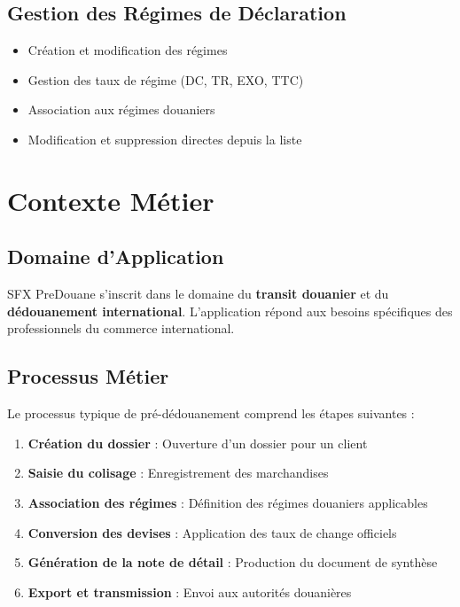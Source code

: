\documentclass[12pt,a4paper]{report}
\begin{document}
\subsection{Gestion des Régimes de Déclaration}
\begin{itemize}[leftmargin=*]
    \item Création et modification des régimes
    \item Gestion des taux de régime (DC, TR, EXO, TTC)
    \item Association aux régimes douaniers
    \item Modification et suppression directes depuis la liste
\end{itemize}

\section{Contexte Métier}

\subsection{Domaine d'Application}

SFX PreDouane s'inscrit dans le domaine du \textbf{transit douanier} et du \textbf{dédouanement international}. L'application répond aux besoins spécifiques des professionnels du commerce international.

\subsection{Processus Métier}

Le processus typique de pré-dédouanement comprend les étapes suivantes :

\begin{enumerate}[leftmargin=*]
    \item \textbf{Création du dossier} : Ouverture d'un dossier pour un client
    \item \textbf{Saisie du colisage} : Enregistrement des marchandises
    \item \textbf{Association des régimes} : Définition des régimes douaniers applicables
    \item \textbf{Conversion des devises} : Application des taux de change officiels
    \item \textbf{Génération de la note de détail} : Production du document de synthèse
    \item \textbf{Export et transmission} : Envoi aux autorités douanières
\end{enumerate}
\end{document}
